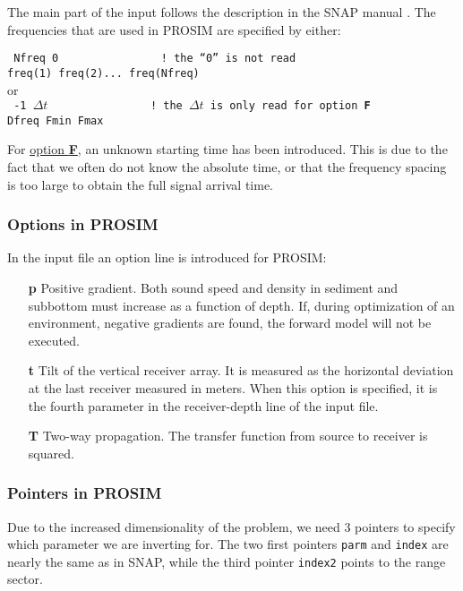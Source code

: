 \documentclass{saclantc}
\begin{document}
The main part of the input follows the description in the {\sf SNAP} manual
\cite{snap}. The frequencies that are used in {\sf PROSIM} 
are specified by either:

{\tt
Nfreq  0~~~~~~~~~~~~~~~     ! the  ``0'' is not read\\
freq(1) freq(2)... freq(Nfreq)\\
}
or \\
{\tt
-1   $\Delta t$~~~~~~~~~~~~~~~     ! the  $\Delta t$ is only read for
option {\bf F} \\
Dfreq Fmin Fmax\\
}

For \underline{option {\bf F}}, an unknown starting time has been introduced. This
is due to the fact that we often do not know the absolute time, or that
the frequency spacing is too large to obtain the full signal arrival time.


\clearpage
\subsubsection{Options in PROSIM}
In the input file an option line is introduced for {\sf PROSIM}:
\begin{itemize}
 \item[\bf p]     Positive gradient. Both sound speed and density in
sediment and subbottom must increase as a function of depth.
If, during optimization of an environment, negative gradients are found, the
forward model will not be executed.
 \item[\bf t] Tilt of the vertical receiver array. 
It is measured
as the horizontal deviation at the last receiver measured in
meters. When this option is specified, it is the fourth parameter in
the receiver-depth line of the input file.
   \item[\bf T] Two-way propagation. The transfer function from source to receiver is squared.

\end{itemize}


\subsubsection{Pointers in PROSIM}
\label{se:prosimpoint}
Due to the increased dimensionality of the problem, we need 3 pointers to specify
which parameter we are inverting for. The two first pointers {\tt parm} and
{\tt index} are nearly the same as in
{\sf SNAP}, while the third pointer {\tt index2} points to the range sector.
\end{document}
